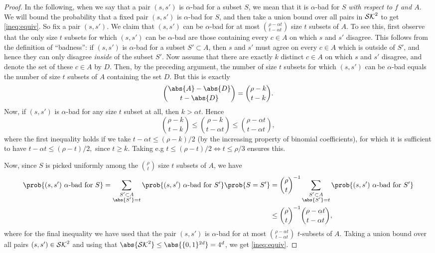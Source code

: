 \begin{proof}
  In the following, when we say that a pair \((s,s')\) is \(\alpha\)-bad for a subset \(S\),
  we mean that it is \(\alpha\)-bad for \(S\) \emph{with respect to \(f\) and \(A\)}.
  We will bound the probability that a fixed pair \((s,s')\) is \(\alpha\)-bad for \(S\),
  and then take a union bound over all pairs in \(\mathcal{SK}^{2}\) to get \eqref{ineq:equiv}.
  So fix a pair \((s,s')\).
  We claim that \((s,s')\) can be \(\alpha\)-bad for at most \(\binom{\rho - \alpha t}{t - \alpha t}\) size \(t\) subsets of \(A\).
  To see this, first observe that the only size \(t\) subsets for which \((s, s')\) can be \(\alpha\)-bad
  are those containing every \(c \in A\) on which \(s\) and \(s'\) disagree.
  This follows from the definition of ``badness'':
  if \((s,s')\) is \(\alpha\)-bad for a subset \(S' \subset A\),
  then \(s\) and \(s'\) must agree on every \(c \in A\) which is outside of \(S'\),
  and hence they can only disagree \emph{inside} of the subset \(S'\).
  Now assume that there are exactly \(k\) distinct \(c \in A\) on which \(s\) and \(s'\)
  disagree, and denote the set of these \(c \in A\) by \(D\).
  Then, by the preceding argument, the number of size \(t\) subsets for which \((s, s')\)
  can be \(\alpha\)-bad equals the number of size \(t\) subsets of \(A\) containing the set \(D\).
  But this is exactly
  \[
    \binom{\abs{A} - \abs{D}}{t - \abs{D}} = \binom{\rho - k}{t - k}.
  \]
  Now, if \((s, s')\) is \(\alpha\)-bad for any size \(t\) subset at all, then \(k > \alpha t\). Hence
  \[
    \binom{\rho - k}{t - k} \le \binom{\rho - k}{t - \alpha t} \le \binom{\rho - \alpha t}{t - \alpha t},
  \]
  where the first inequality holds if we take
  \(
    t - \alpha t \le (\rho - k)/2
  \)
  (by the increasing property of binomial coefficients),
  for which it is sufficient to have
  \(
    t - \alpha t \le (\rho - t)/2,
  \)
  since \(t \ge k\).
  Taking e.g \(t \le (\rho - t)/2 \iff t \le \rho / 3\) ensures this.

  Now, since \(S\) is picked uniformly among the \(\binom{\rho}{t}\) size \(t\) subsets
  of \(A\), we have
  \begin{align}
    \prob{(s,s') \text{ \(\alpha\)-bad for } S} = \sum_{\substack{S' \subset A\\\abs{S'} = t}}{\prob{(s, s') \text{ \(\alpha\)-bad for } S'}\prob{S = S'}}
    & = {\binom{\rho}{t}}^{-1} \sum_{\substack{S' \subset A\\\abs{S'} = t}}{\prob{(s, s') \text{ \(\alpha\)-bad for } S'}}\notag\\
    & \le {\binom{\rho}{t}}^{-1} \binom{\rho - \alpha t}{t - \alpha t}, \notag
  \end{align}
  where for the final inequality we have used that the pair \((s, s')\) is
  \(\alpha\)-bad for at most \(\binom{\rho - \alpha t}{t - \alpha t}\) \(t\)-subsets of \(A\).
  Taking a union bound over all pairs \((s,s') \in \mathcal{SK}^{2}\) and using that \(\abs{\setSK^{2}} \le \abs{\{0,1\}^{2d}} = 4^{d}\),
  we get \eqref{ineq:equiv}.
\end{proof}

